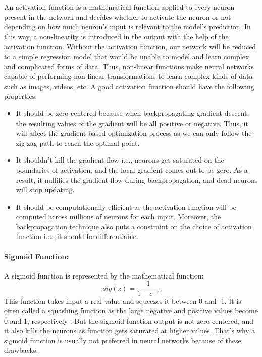 An activation function is a mathematical function applied to every neuron present in the network and decides whether to activate the neuron or not depending on how much neuron’s input is relevant to the model’s prediction. 
In this way, a non-linearity is introduced in the output with the help of the activation function. Without the activation function, our network will be reduced to a simple regression model that would be unable to model and learn complex and complicated forms of data. Thus, non-linear functions make neural networks capable of performing non-linear transformations to learn complex kinds of data such as images, videos, etc. A good activation 
function should have the following properties:
\begin{itemize}
\item It should be zero-centered because when backpropagating gradient descent, the resulting values of the gradient will be all positive or negative. Thus, it will affect the gradient-based optimization process as we can only follow the zig-zag path to reach the optimal point.
\item It shouldn’t kill the gradient flow i.e., neurons get saturated on the boundaries of activation, and the local gradient comes out to be zero. As a result, it nullifies the gradient flow during backpropagation, and dead neurons will stop updating.
\item It should be computationally efficient as the activation function will be computed across millions of neurons for each input. Moreover, the backpropagation technique also puts a constraint on the choice of activation function i.e.; it should be differentiable.

\end{itemize}

\paragraph*{Sigmoid Function:}
A sigmoid function is represented by the mathematical function:
\begin{equation}
    sig(z) = \frac{1}{1+e^{-z}}
\end{equation}
This function takes input a real value and squeezes it between 0 and -1. It is often called
a squashing function as the large negative and positive values become 0 and 1, respectively \cite{chap_3_article:5}. But the sigmoid function output is not zero-centered, and it also kills the neurons as function gets saturated at higher values. That’s why a sigmoid function is usually not preferred in neural networks because of these drawbacks.

